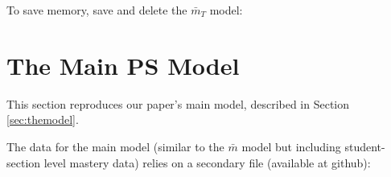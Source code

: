 \documentclass{article}
\begin{document}
To save memory, save and delete the $\bar{m}_T$ model:
\begin{kframe}
\begin{alltt}
\hlstd{=}\hlstd{)}
\end{alltt}
\end{kframe}
\begin{knitrout}
\color{fgcolor}\begin{kframe}
\begin{alltt}
 \hlstd{()}
\end{alltt}
\end{kframe}
\end{knitrout}


\section{The Main PS Model}
This section reproduces our paper's main model, described in Section \ref{sec:themodel}.

The data for the main model (similar to the $\bar{m}$ model but
including student-section level mastery data) relies on a secondary
file (available at github):
\begin{kframe}
\begin{alltt}
\hlstd{(}\hlstd{)}
\end{alltt}
\end{kframe}
\end{document}
